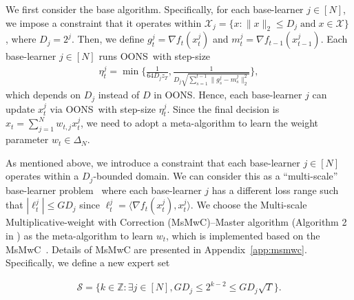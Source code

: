 \documentclass{article}
\renewcommand{\citet}{\citep}
\theoremstyle{plain}
\theoremstyle{definition}
\theoremstyle{remark}
\newcommand{\cE}{\mathcal{E}}
\newcommand{\cM}{\mathcal{M}}
\newcommand{\cS}{\mathcal{S}}
\newcommand{\cX}{\mathcal{X}}
\newcommand{\oons}{{\sc OONS}}
\newcommand{\real}{\mathbb{R}}
\begin{document}
We first consider the base algorithm. Specifically, for each base-learner $ j \in [N] $, we impose a constraint that it operates within   $\cX_j = \{ x : \|x\|_2 \leq D_j \;\text{and}\; x \in \cX \} $
, where $D_j = 2^j$. Then, we define $g_t^j=\nabla f_{t}(x_{t}^j)$ and $m_t^j=\nabla f_{t-1}(x_{t-1}^j)$. Each base-learner $j\in[N]$ runs \oons\ with step-size 
\begin{align}
\label{eq:PF-OONSwE eta stepsize}
\eta_t^j=\min\bigg\{\frac{1}{64D_jz_T},\frac{1}{D_j\sqrt{\sum_{s=1}^{t-1}\|g_{s}^j-m_s^j\|_2^2}}\bigg\},
\end{align}
which depends on $D_j$ instead of $D$ in \oons. Hence, each base-learner $j$ can update $x_t^j$ via \oons\ with step-size $\eta_t^j$. Since the final decision is  $x_t=\sum_{j=1}^N w_{t,j} x_t^j$, we need to adopt a meta-algorithm to learn the weight parameter $w_t\in \Delta_N$.

As mentioned above, we introduce a constraint that each base-learner $j\in[N]$ operates within a $D_j$-bounded domain. We can consider this as a ``multi-scale'' base-learner problem~\cite{bubeck2017online,cutkosky2018black,chen2021impossible} where each base-learner $j$ has a different loss range such that $|\ell_{t}^j|\leq GD_j$ since $\ell_{t}^j= \langle\nabla f_t(x_t^j),x_t^j\rangle$. We choose the Multi-scale Multiplicative-weight with Correction (MsMwC)--Master algorithm (Algorithm 2 in \citet{chen2021impossible}) as the meta-algorithm to learn $w_t$, which is implemented based on the MsMwC~\cite{chen2021impossible}. Details of MsMwC are presented in Appendix~\ref{app:msmwc}.%
Specifically, we define a new expert set 

\begin{align}\label{eq:expertset}
\cS=\{k\in \mathbb{Z}:\exists j\in[N], GD_j \!\leq\! 2^{k-2}\!\leq\! GD_j\sqrt{T}\}.
\end{align}
\end{document}
